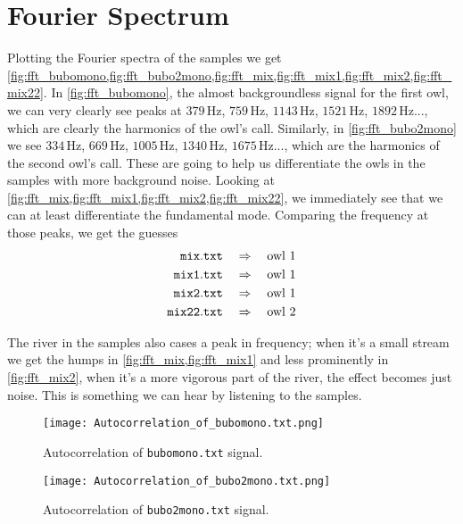 \documentclass[10pt,a4paper,twocolumn]{article}
\newcommand{\si}[2]{$#1 \, \mathrm{#2}$}
\begin{document}
\section{Fourier Spectrum}

Plotting the Fourier spectra of the samples we get \cref{fig:fft_bubomono,fig:fft_bubo2mono,fig:fft_mix,fig:fft_mix1,fig:fft_mix2,fig:fft_mix22}. In \cref{fig:fft_bubomono}, the almost backgroundless signal for the first owl, we can very clearly see peaks at \si{379}{Hz}, \si{759}{Hz}, \si{1143}{Hz}, \si{1521}{Hz}, \si{1892}{Hz}..., which are clearly the harmonics of the owl's call. Similarly, in \cref{fig:fft_bubo2mono} we see \si{334}{Hz}, \si{669}{Hz}, \si{1005}{Hz}, \si{1340}{Hz}, \si{1675}{Hz}..., which are the harmonics of the second owl's call. These are going to help us differentiate the owls in the samples with more background noise. Looking at \cref{fig:fft_mix,fig:fft_mix1,fig:fft_mix2,fig:fft_mix22}, we immediately see that we can at least differentiate the fundamental mode. Comparing the frequency at those peaks, we get the guesses
%
\begin{align}
\mathtt{mix.txt} \quad &\Rightarrow \quad \mathrm{owl}\ 1\notag\\
\mathtt{mix1.txt} \quad &\Rightarrow \quad \mathrm{owl}\ 1\notag\\
\mathtt{mix2.txt} \quad &\Rightarrow \quad \mathrm{owl}\ 1\notag\\
\mathtt{mix22.txt} \quad &\Rightarrow \quad \mathrm{owl}\ 2
\end{align}

The river in the samples also cases a peak in frequency; when it's a small stream we get the humps in \cref{fig:fft_mix,fig:fft_mix1} and less prominently in \cref{fig:fft_mix2}, when it's a more vigorous part of the river, the effect becomes just noise. This is something we can hear by listening to the samples.


\begin{figure}
\centering
\captionsetup{justification=centering}
\texttt{[image: Autocorrelation\_of\_bubomono.txt.png]}
\caption{Autocorrelation of \texttt{bubomono.txt} signal.}
\label{fig:acr_bubomono}
\end{figure}

\begin{figure}
\centering
\captionsetup{justification=centering}
\texttt{[image: Autocorrelation\_of\_bubo2mono.txt.png]}
\caption{Autocorrelation of \texttt{bubo2mono.txt} signal.}
\label{fig:acr_bubo2mono}
\end{figure}
\end{document}
